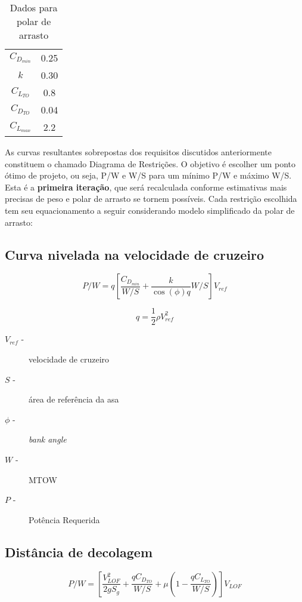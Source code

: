 \begin{table}[H]
\centering
\begin{tabular}{cc}
\toprule
$C_{D_{min}}$ & 0.25 \\
$k$ & 0.30 \\
$C_{L_{TO}}$ & 0.8 \\
$C_{D_{TO}}$  & 0.04 \\
$C_{L_{max}}$ & 2.2 \\
\bottomrule
\end{tabular}
\caption[Dados para polar de arrasto]{Dados para polar de arrasto}
\label{tbl:polar_arrasto}
\end{table}

As curvas resultantes sobrepostas dos requisitos discutidos anteriormente constituem o chamado Diagrama de Restrições.
O objetivo é escolher um ponto ótimo de projeto, ou seja, P/W e W/S para um mínimo P/W e máximo W/S.
Esta é a \textbf{primeira iteração}, que será recalculada conforme estimativas mais precisas de peso e polar de arrasto se tornem possíveis.
Cada restrição escolhida tem seu equacionamento a seguir considerando modelo simplificado da polar de arrasto:



\subsection{Curva nivelada na velocidade de cruzeiro }
\begin{equation}
P/W = q \left[\frac{C_{D_{min}}}{W/S} + \frac{k}{\cos(\phi)q} W/S \right] V_{ref}
\end{equation}

\begin{equation}
q = \frac{1}{2} \rho V_{ref}^2
\end{equation}

\begin{description}
 \item[$V_{ref}$  -]velocidade de cruzeiro
 \item[$S$ -]área de referência da asa
 \item[$\phi$  -]\textit{bank angle}
 \item[$W$  -]MTOW
 \item[$P$  -]Potência Requerida
\end{description}

\subsection{Distância de decolagem}
\begin{equation}
P/W = \left[\frac{V_{LOF}^2}{2 g S_g} + \frac{q C_{D_{TO}}}{W/S} + \mu \left(1 - \frac{q C_{L_{TO}}}{W/S} \right) \right] V_{LOF}
\end{equation}

